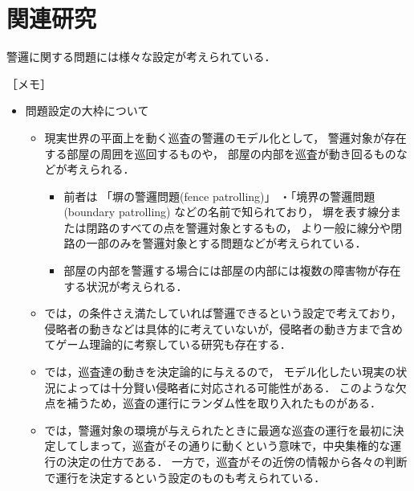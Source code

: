 \section{関連研究}
\label{section: relatedWorks}

警邏に関する問題には様々な設定が考えられている．

［メモ］
\begin{itemize}

  \item 問題設定の大枠について
  \begin{itemize}
    \item 現実世界の平面上を動く巡査の警邏のモデル化として，
      警邏対象が存在する部屋の周囲を巡回するものや，
      部屋の内部を巡査が動き回るものなどが考えられる．
    \begin{itemize}
      \item 
        前者は
        「塀の警邏問題(fence patrolling)」
        ・「境界の警邏問題(boundary patrolling)
        などの名前で知られており，
        塀を表す線分または閉路のすべての点を警邏対象とするもの\cite{czyzowicz2011boundary, dumitrescu2014fence, kawamura2015fence}，
        より一般に線分や閉路の一部のみを警邏対象とする問題などが考えられている\cite{collins2013optimal}．
      \item 
        部屋の内部を警邏する場合には部屋の内部には複数の障害物が存在する状況が考えられる\cite{}．
        
    \end{itemize}
    \item {\patProb}では，{\maxIdletime}の条件さえ満たしていれば警邏できるという設定で考えており，侵略者の動きなどは具体的に考えていないが，侵略者の動き方まで含めてゲーム理論的に考察している研究も存在する\cite{brazdil2015strategy, papadaki2016patrolling}．
    \item {\patProb}では，巡査達の動きを決定論的に与えるので，
    モデル化したい現実の状況によっては十分賢い侵略者に対応される可能性がある．
    このような欠点を補うため，巡査の運行にランダム性を取り入れたものがある\cite{}．
    \item {\patProb}では，警邏対象の環境が与えられたときに最適な巡査の運行を最初に決定してしまって，巡査がその通りに動くという意味で，中央集権的な運行の決定の仕方である．
    一方で，巡査がその近傍の情報から各々の判断で運行を決定するという設定のものも考えられている\cite{}．
  \end{itemize}


\end{itemize}
